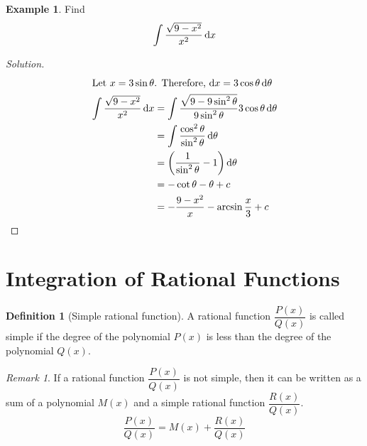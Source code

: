 \documentclass[fleqn]{article}
\theoremstyle{definition}
\newtheorem{example}{Example}
\newtheorem{definition}{Definition}
\theoremstyle{theorem}
\theoremstyle{remark}
\newtheorem{remark}{Remark}
\newenvironment{solution}
{\begin{proof}[Solution]\let\qed\relax}
	{\end{proof}}
\begin{document}
\begin{example}
	Find
	\begin{equation*}
		\int \dfrac{\sqrt{9 - x^2}}{x^2} \dif x
	\end{equation*}
\end{example}

\begin{solution}
	\begin{align*}
	\intertext{Let $x = 3 \sin \theta$. Therefore, $\dif x = 3 \cos \theta \dif \theta$}
	\int \dfrac{\sqrt{9 - x^2}}{x^2} \dif x &= \int \dfrac{\sqrt{9 - 9 \sin^2 \theta}}{9 \sin^2 \theta} 3 \cos \theta \dif \theta\\
	&= \int \dfrac{\cos^2 \theta}{\sin^2 \theta} \dif \theta\\
	&= \left(\dfrac{1}{\sin^2 \theta} - 1\right) \dif \theta\\
	&= -\cot \theta - \theta + c\\
	&= - \dfrac{9 - x^2}{x} - \arcsin \dfrac{x}{3} + c
	\end{align*}
\end{solution}

\section{Integration of Rational Functions}

\begin{definition}[Simple rational function]
	A rational function $\dfrac{P(x)}{Q(x)}$ is called simple if the degree of the polynomial $P(x)$ is less than the degree of the polynomial $Q(x)$.
\end{definition}

\begin{remark}
	If a rational function $\dfrac{P(x)}{Q(x)}$ is not simple, then it can be written as a sum of a polynomial $M(x)$ and a simple rational function $\dfrac{R(x)}{Q(x)}$.
	\begin{equation*}
		\dfrac{P(x)}{Q(x)} = M(x) + \dfrac{R(x)}{Q(x)}
	\end{equation*}
\end{remark}
\end{document}
